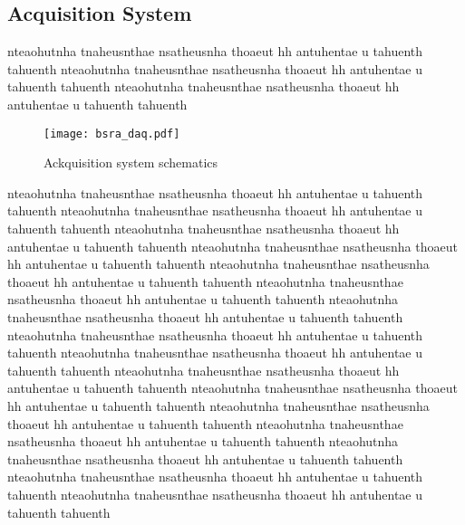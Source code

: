 \subsection{Acquisition System}
nteaohutnha tnaheusnthae nsatheusnha thoaeut hh antuhentae u tahuenth tahuenth
nteaohutnha tnaheusnthae nsatheusnha thoaeut hh antuhentae u tahuenth tahuenth
nteaohutnha tnaheusnthae nsatheusnha thoaeut hh antuhentae u tahuenth tahuenth
\begin{figure}[!tbh]
    \centering
    \texttt{[image: bsra\_daq.pdf]}
    \caption{Ackquisition system schematics}
    \label{fig:bsra_daq}
\end{figure}
nteaohutnha tnaheusnthae nsatheusnha thoaeut hh antuhentae u tahuenth tahuenth
nteaohutnha tnaheusnthae nsatheusnha thoaeut hh antuhentae u tahuenth tahuenth
nteaohutnha tnaheusnthae nsatheusnha thoaeut hh antuhentae u tahuenth tahuenth
nteaohutnha tnaheusnthae nsatheusnha thoaeut hh antuhentae u tahuenth tahuenth
nteaohutnha tnaheusnthae nsatheusnha thoaeut hh antuhentae u tahuenth tahuenth
nteaohutnha tnaheusnthae nsatheusnha thoaeut hh antuhentae u tahuenth tahuenth
nteaohutnha tnaheusnthae nsatheusnha thoaeut hh antuhentae u tahuenth tahuenth
nteaohutnha tnaheusnthae nsatheusnha thoaeut hh antuhentae u tahuenth tahuenth
nteaohutnha tnaheusnthae nsatheusnha thoaeut hh antuhentae u tahuenth tahuenth
nteaohutnha tnaheusnthae nsatheusnha thoaeut hh antuhentae u tahuenth tahuenth
nteaohutnha tnaheusnthae nsatheusnha thoaeut hh antuhentae u tahuenth tahuenth
nteaohutnha tnaheusnthae nsatheusnha thoaeut hh antuhentae u tahuenth tahuenth
nteaohutnha tnaheusnthae nsatheusnha thoaeut hh antuhentae u tahuenth tahuenth
nteaohutnha tnaheusnthae nsatheusnha thoaeut hh antuhentae u tahuenth tahuenth
nteaohutnha tnaheusnthae nsatheusnha thoaeut hh antuhentae u tahuenth tahuenth
nteaohutnha tnaheusnthae nsatheusnha thoaeut hh antuhentae u tahuenth tahuenth

